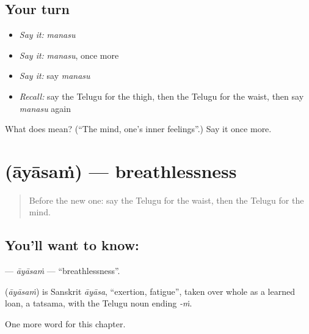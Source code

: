 \subsection*{Your turn}
\begin{itemize}
\raggedright
  \item \emph{Say it:} \emph{manasu}
  \item \emph{Say it:} \emph{manasu}, once more
  \item \emph{Say it:} say \emph{manasu}
  \item \emph{Recall:} say the Telugu for the thigh, then the Telugu for the waist, then say \emph{manasu} again
\end{itemize}

\begin{tcolorbox}[breakable,colback=teal!4,colframe=teal!35!black,title={Before you move on}]
What does  mean? (\textquotedblleft{}The mind, one's inner feelings\textquotedblright{}.) Say it once more.
\end{tcolorbox}
\section[\texorpdfstring{\te{ఆయాసం} (āyāsaṁ)}{ఆయాసం (āyāsaṁ)}]{ (āyāsaṁ) — breathlessness}

\label{lesson:TE-C251-ayasam}



\begin{quote}
Before the new one: say the Telugu for the waist, then the Telugu for the mind.
\end{quote}

\subsection*{You'll want to know: }
\textbf{} — \emph{āyāsaṁ} — \textquotedblleft{}breathlessness\textquotedblright{}.

\begin{cousinweb}
\textbf{} (\emph{āyāsaṁ}) is Sanskrit \emph{āyāsa}, \textquotedblleft{}exertion, fatigue\textquotedblright{}, taken over whole as a learned loan, a tatsama, with the Telugu noun ending \emph{-ṁ}.
\end{cousinweb}

\begin{grammarlens}[title={What you've built}]
One more word for this chapter.
\end{grammarlens}

